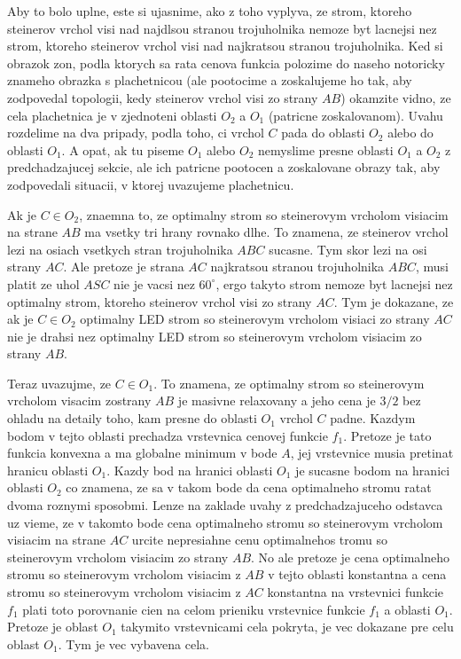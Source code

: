 \documentclass[12pt]{book}
\begin{document}
Aby to bolo uplne, este si ujasnime, ako z toho vyplyva, ze strom, ktoreho
    steinerov vrchol visi nad najdlsou stranou trojuholnika nemoze byt lacnejsi
    nez strom, ktoreho steinerov vrchol visi nad najkratsou stranou
    trojuholnika.
Ked si obrazok zon, podla ktorych sa rata cenova funkcia polozime do naseho
    notoricky znameho obrazka s plachetnicou (ale pootocime a zoskalujeme ho
    tak, aby zodpovedal topologii, kedy steinerov vrchol visi zo strany $AB$)
    okamzite vidno, ze cela plachetnica je v zjednoteni oblasti $O_{2}$ a
    $O_{1}$ (patricne zoskalovanom).
Uvahu rozdelime na dva pripady, podla toho, ci vrchol $C$ pada do oblasti
    $O_{2}$ alebo do oblasti $O_{1}$.
A opat, ak tu piseme $O_{1}$ alebo $O_{2}$ nemyslime presne oblasti $O_{1}$
    a $O_{2}$ z predchadzajucej sekcie, ale ich patricne pootocen a zoskalovane
    obrazy tak, aby zodpovedali situacii, v ktorej uvazujeme plachetnicu.

Ak je $C\in O_{2}$, znaemna to, ze optimalny strom so steinerovym vrcholom
    visiacim na strane $AB$ ma vsetky tri hrany rovnako dlhe.
To znamena, ze steinerov vrchol lezi na osiach vsetkych stran trojuholnika
    $ABC$ sucasne.
Tym skor lezi na osi strany $AC$.
Ale pretoze je strana $AC$ najkratsou stranou trojuholnika $ABC$, musi platit
    ze uhol $ASC$ nie je vacsi nez $60^{\circ}$, ergo takyto strom nemoze
    byt lacnejsi nez optimalny strom, ktoreho steinerov vrchol visi zo strany
    $AC$.
Tym je dokazane, ze ak je $C\in O_{2}$ optimalny LED strom so steinerovym
    vrcholom visiaci zo strany $AC$ nie je drahsi nez optimalny LED strom so
    steinerovym vrcholom visiacim zo strany $AB$.

Teraz uvazujme, ze $C\in O_{1}$.
To znamena, ze optimalny strom so steinerovym vrcholom visacim zostrany $AB$
    je masivne relaxovany a jeho cena je $3/2$ bez ohladu na detaily toho, kam
    presne do oblasti $O_{1}$ vrchol $C$ padne.
Kazdym bodom v tejto oblasti prechadza vrstevnica cenovej funkcie $f_{1}$.
Pretoze je tato funkcia konvexna a ma globalne minimum v bode $A$, jej
    vrstevnice musia pretinat hranicu oblasti $O_{1}$.
Kazdy bod na hranici oblasti $O_{1}$ je sucasne bodom na hranici oblasti
    $O_{2}$ co znamena, ze sa v takom bode da cena optimalneho stromu ratat
    dvoma roznymi sposobmi.
Lenze na zaklade uvahy z predchadzajuceho odstavca uz vieme, ze v takomto bode
    cena optimalneho stromu so steinerovym vrcholom visiacim na strane $AC$
    urcite nepresiahne cenu optimalnehos tromu so steinerovym vrcholom visiacim
    zo strany $AB$.
No ale pretoze je cena optimalneho stromu so steinerovym vrcholom visiacim z
    $AB$ v tejto oblasti konstantna a cena stromu so steinerovym vrcholom
    visiacim z $AC$ konstantna na vrstevnici funkcie $f_{1}$ plati toto
    porovnanie cien na celom prieniku vrstevnice funkcie $f_{1}$ a oblasti
    $O_{1}$.
Pretoze je oblast $O_{1}$ takymito vrstevnicami cela pokryta, je vec dokazane
    pre celu oblast $O_{1}$.
Tym je vec vybavena cela.
\end{document}
